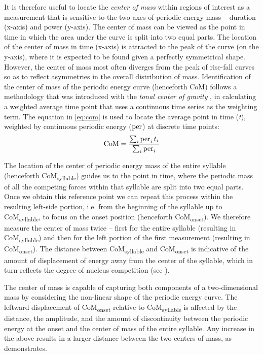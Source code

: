 It is therefore useful to locate the \emph{center of mass} within regions of interest as a measurement that is sensitive to the two axes of periodic energy mass -- duration (x-axis) and power (y-axis). The center of mass can be viewed as the point in time in which the area under the curve is split into two equal parts. The location of the center of mass in time (x-axis) is attracted to the peak of the curve (on the y-axis), where it is expected to be found given a perfectly symmetrical shape. However, the center of mass most often diverges from the peak of rise-fall curves so as to reflect asymmetries in the overall distribution of mass. Identification of the center of mass of the periodic energy curve (henceforth CoM) follows a methodology that was introduced with the \emph{tonal center of gravity} \citep{barnes2012tonal}, in calculating a weighted average time point that uses a continuous time series as the weighting term. The equation in \eqref{eq:com} is used to locate the average point in time (\emph{t}), weighted by continuous periodic energy ($\operatorname{per}$) at discrete time points:
\begin{equation}
\text{CoM} = \frac{\sum_i \operatorname{per}_i t_i}{\sum_i \operatorname{per}_i}  \label{eq:com}
\end{equation}

The location of the center of periodic energy mass of the entire syllable (henceforth {CoM\textsubscript{syllable}}) guides us to the point in time, where the periodic mass of all the competing forces within that syllable are split into two equal parts. Once we obtain this reference point we can repeat this process within the resulting left-side portion, i.e. from the beginning of the syllable up to {CoM\textsubscript{syllable}}, to focus on the onset position (henceforth {CoM\textsubscript{onset}}).
We therefore measure the center of mass twice -- first for the entire syllable (resulting in {CoM\textsubscript{syllable}}) and then for the left portion of the first measurement (resulting in {CoM\textsubscript{onset}}).
The distance between {CoM\textsubscript{syllable}} and {CoM\textsubscript{onset}} is indicative of the amount of displacement of energy away from the center of the syllable, which in turn reflects the degree of nucleus competition (see ).

The center of mass is capable of capturing both components of a two-di\-men\-sion\-al mass by considering the non-linear shape of the periodic energy curve.
The leftward displacement of {CoM\textsubscript{onset}} relative to {CoM\textsubscript{syllable}} is affected by the distance, the amplitude, and the amount of discontinuity between the periodic energy at the onset and the center of mass of the entire syllable.
Any increase in the above results in a larger distance between the two centers of mass, as  demonstrates.

